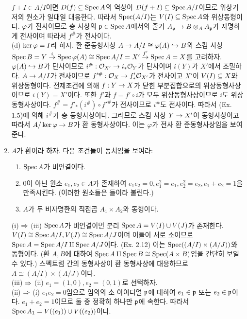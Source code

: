 \begin{enumerate}[label=\tb{2.\arabic*.},itemindent=0mm,itemsep=4mm]
	$f+I\in A/I$이면 $D(f)\subseteq\operatorname{Spec} A$의 역상이 $D(f+I)\subseteq\operatorname{Spec} A/I$이므로 위상기저의 원소가 일대일 대응한다.
	따라서 $\operatorname{Spec}(A/I)$는 $V(I)\subseteq\operatorname{Spec} A$와 위상동형이다.
	$\varphi$가 전사이므로 층 사상의 $\mathfrak{p}\in\operatorname{Spec} A$에서의 줄기 $A_{\mathfrak{p}}\rightarrow B\otimes_AA_{\mathfrak{p}}$가 자명하게 전사이며
	따라서 $f^\#$가 전사이다.\\
	(d) $\ker\varphi=I$라 하자. 환 준동형사상 $A\rightarrow A/I\cong\varphi(A)\hookrightarrow B$와
	스킴 사상 $\operatorname{Spec} B=Y\stackrel{i}{\rightarrow}\operatorname{Spec}\varphi(A)\cong\operatorname{Spec} A/I=X'\stackrel{f'}{\rightarrow}\operatorname{Spec} A=X$를 고려하자.
	$\varphi(A)\hookrightarrow B$가 단사이므로 $i^\#:\mathcal{O}_{X'}\rightarrow i_*\mathcal{O}_Y$가 단사이며 $i(Y)$가 $X'$에서 조밀하다.
	$A\rightarrow A/I$가 전사이므로 $f'^\#:\mathcal{O}_X\rightarrow f'_*\mathcal{O}_{X'}$가 전사이고 $X'$이 $V(I)\subseteq X$와 위상동형이다.
	전제조건에 의해 $f:Y\rightarrow X$가 닫힌 부분집합으로의 위상동형사상이므로 $i(Y)=X'$이다.
	또한 $f'$과 $f=f'\circ i$가 모두 위상동형사상이므로 $i$도 위상동형사상이다.
	$f^\#=f'_*(i^\#)\circ f'^\#$가 전사이므로 $i^\#$도 전사이다. 따라서 (Ex. 1.5)에 의해 $i^\#$가 층 동형사상이다.
	그러므로 스킴 사상 $Y\rightarrow X'$이 동형사상이고 따라서 $A/\ker\varphi\rightarrow B$가 환 동형사상이다.
	이는 $\varphi$가 전사 환 준동형사상임을 보여준다.
	\item $A$가 환이라 하자. 다음 조건들이 동치임을 보여라:\\[-2mm]
	\begin{enumerate}[label=(\roman*)]
	\item $\operatorname{Spec} A$가 비연결이다.
	\item 0이 아닌 원소 $e_1,e_2\in A$가 존재하여 $e_1e_2=0,e_1^2=e_1,e_2^2=e_2,e_1+e_2=1$을 만족시킨다.
	(이러한 원소들은 들이라 불린다.)
	\item $A$가 두 비자명환의 직접곱 $A_1\times A_2$와 동형이다.
	\end{enumerate}
	\sol (i) $\Rightarrow$ (iii) $\operatorname{Spec} A$가 비연결이면 분리 $\operatorname{Spec} A=V(I)\cup V(J)$가 존재한다.
	$V(I)\cong\operatorname{Spec} A/I,V(J)\cong\operatorname{Spec} A/J$이며 이들이 서로 소이므로 $\operatorname{Spec} A=\operatorname{Spec} A/I\amalg\operatorname{Spec} A/J$이다. (Ex. 2.12)
	이는 $\operatorname{Spec}((A/I)\times(A/J))$와 동형이다.
	(환 $A,B$에 대하여 $\operatorname{Spec} A\amalg\operatorname{Spec} B\cong\operatorname{Spec}(A\times B)$임을 간단히 보일 수 있다.)
	스펙트럼 간의 동형사상이 환 동형사상에 대응하므로 $A\cong(A/I)\times(A/J)$이다.\\
	(iii) $\Rightarrow$ (ii) $e_1=(1,0),e_2=(0,1)$로 선택하자.\\
	(ii) $\Rightarrow$ (i) $e_1e_2=0$임으로 임의의 소 아이디얼 $\mathfrak{p}$에 대하여 $e_1\in\mathfrak{p}$ 또는 $e_2\in\mathfrak{p}$이다.
	$e_1+e_2=1$이므로 둘 중 정확히 하나만 $\mathfrak{p}$에 속한다. 따라서 $\operatorname{Spec} A_1=V((e_1))\cup V((e_2))$이다.
	\end{enumerate}
	
